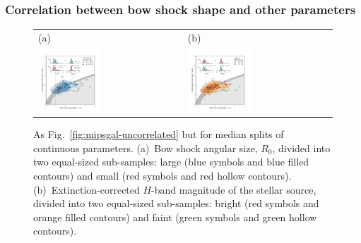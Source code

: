 
\subsubsection{Correlation between bow shock shape and other parameters}
\label{sec:corr-shape}
\begin{figure}
  \centering
  \begin{tabular}{ll}
    (a) & (b) \\
    \includegraphics[width=0.45\textwidth]{figs/mipsgal-Rc-R90-R0} &
    \includegraphics[width=0.45\textwidth]{figs/mipsgal-Rc-R90-Mag} 
  \end{tabular}
  \caption[]{As Fig.~\ref{fig:mipsgal-uncorrelated} but for median
    splits of continuous parameters. (a)~Bow shock angular size,
    \(R_0\), divided into two equal-sized sub-samples: large (blue
    symbols and blue filled contours) and small (red symbols and red
    hollow contours).  (b)~Extinction-corrected \(H\)-band magnitude
    of the stellar source, divided into two equal-sized sub-samples:
    bright (red symbols and orange filled contours) and faint (green
    symbols and green hollow contours).}
  \label{fig:mipsgal-correlated}
\end{figure}

